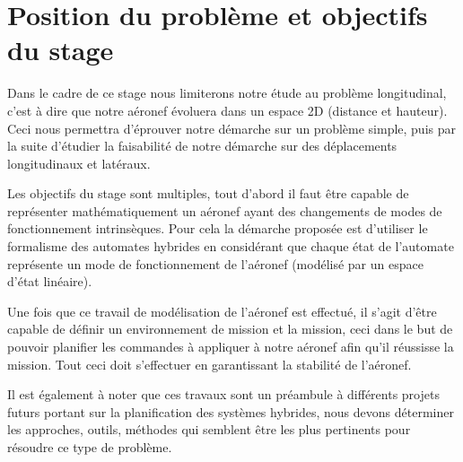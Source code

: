 
\section[Problématique]{Position du problème et objectifs du stage}	
\noindent
{}
	
Dans le cadre de ce stage nous limiterons notre étude au problème longitudinal, c'est à dire que notre aéronef évoluera dans un espace 2D (distance et hauteur). Ceci nous permettra d'éprouver notre démarche sur un problème simple, puis par la suite d'étudier la faisabilité de notre démarche sur des déplacements longitudinaux et latéraux.

Les objectifs du stage sont multiples, tout d'abord il faut être capable de représenter mathématiquement un aéronef ayant des changements de modes de fonctionnement intrinsèques. Pour cela la démarche proposée est d'utiliser le formalisme des automates hybrides en considérant que chaque état de l'automate représente un mode de fonctionnement de l'aéronef (modélisé par un espace d'état linéaire).

Une fois que ce travail de modélisation de l'aéronef est effectué, il s'agit d'être capable de définir un environnement de mission et la mission, ceci dans le but de pouvoir planifier les commandes à appliquer à notre aéronef afin qu'il réussisse la mission. Tout ceci doit s'effectuer en garantissant la stabilité de l'aéronef.

Il est également à noter que ces travaux sont un préambule à différents projets futurs portant sur la planification des systèmes hybrides, nous devons déterminer les approches, outils, méthodes qui semblent être les plus pertinents pour résoudre ce type de problème.

